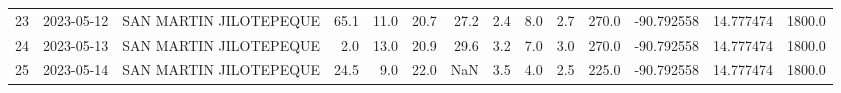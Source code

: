 \documentclass[12pt]{article}
\begin{document}
\begin{center}
\begin{tabular}{lllrrrrrrrrrrr}
23  & 2023-05-12 &  SAN MARTIN JILOTEPEQUE &    65.1 &  11.0 &   20.7 &  27.2 &        2.4 &  8.0 &         2.7 &       270.0 & -90.792558 &  14.777474 &   1800.0 \\
24  & 2023-05-13 &  SAN MARTIN JILOTEPEQUE &     2.0 &  13.0 &   20.9 &  29.6 &        3.2 &  7.0 &         3.0 &       270.0 & -90.792558 &  14.777474 &   1800.0 \\
25  & 2023-05-14 &  SAN MARTIN JILOTEPEQUE &    24.5 &   9.0 &   22.0 &   NaN &        3.5 &  4.0 &         2.5 &       225.0 & -90.792558 &  14.777474 &   1800.0 \\
\bottomrule
\end{tabular}

        
        \end{center}
        
\end{document}
